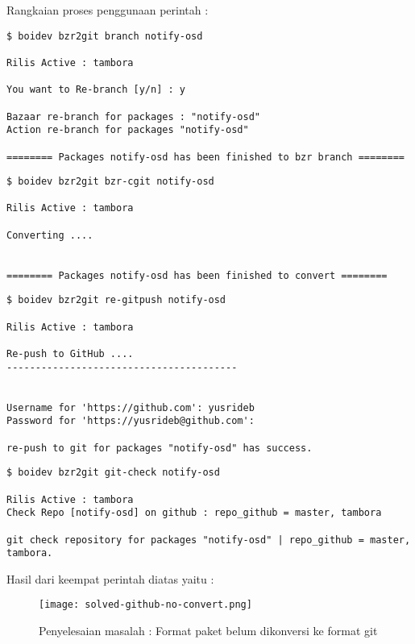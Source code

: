 \noindent
Rangkaian proses penggunaan perintah :

\begin{lstlisting}[language=ShellBash3]
$ boidev bzr2git branch notify-osd

Rilis Active : tambora

You want to Re-branch [y/n] : y

Bazaar re-branch for packages : "notify-osd"
Action re-branch for packages "notify-osd" 

======== Packages notify-osd has been finished to bzr branch ========

\end{lstlisting}

\begin{lstlisting}[language=ShellBash3]
$ boidev bzr2git bzr-cgit notify-osd

Rilis Active : tambora

Converting .... 


======== Packages notify-osd has been finished to convert ========

\end{lstlisting}

\begin{lstlisting}[language=ShellBash3]
$ boidev bzr2git re-gitpush notify-osd

Rilis Active : tambora

Re-push to GitHub .... 
----------------------------------------


Username for 'https://github.com': yusrideb
Password for 'https://yusrideb@github.com': 

re-push to git for packages "notify-osd" has success. 

\end{lstlisting}

\begin{lstlisting}[language=ShellBash3]
$ boidev bzr2git git-check notify-osd

Rilis Active : tambora
Check Repo [notify-osd] on github : repo_github = master, tambora 

git check repository for packages "notify-osd" | repo_github = master, tambora. 
\end{lstlisting}

\noindent
Hasil dari keempat perintah diatas yaitu :

\begin{figure}[H]
	\centering
	\texttt{[image: solved-github-no-convert.png]}
	\caption{Penyelesaian masalah : Format paket belum dikonversi ke format git}
	\label{fig:bab3_solved1-gihub-no-convert}
\end{figure}

